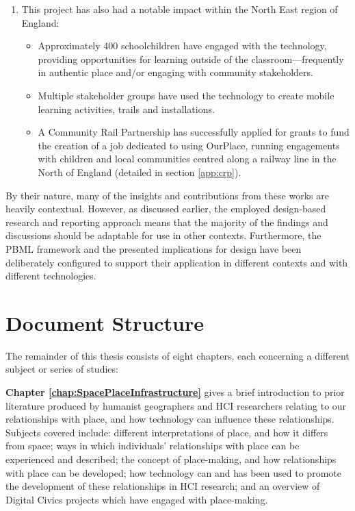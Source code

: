 \begin{enumerate}
    \item This project has also had a notable impact within the North East region of England:
    \begin{itemize}
    \item Approximately 400 schoolchildren have engaged with the technology, providing opportunities for learning outside of the classroom---frequently in authentic place and/or engaging with community stakeholders.
    \item Multiple stakeholder groups have used the technology to create mobile learning activities, trails and installations.
    \item A Community Rail Partnership has successfully applied for grants to fund the creation of a job dedicated to using OurPlace, running engagements with children and local communities centred along a railway line in the North of England (detailed in section \ref{app:crp}).
    \end{itemize}
\end{enumerate}

By their nature, many of the insights and contributions from these works are heavily contextual. However, as discussed earlier, the employed design-based research and reporting approach means that the majority of the findings and discussions should be adaptable for use in other contexts. Furthermore, the PBML framework and the presented implications for design have been deliberately configured to support their application in different contexts and with different technologies.

\section{Document Structure}

The remainder of this thesis consists of eight chapters, each concerning a different subject or series of studies: 

\textbf{Chapter \ref{chap:SpacePlaceInfrastructure}} gives a brief introduction to prior literature produced by humanist geographers and HCI researchers relating to our relationships with place, and how technology can influence these relationships. Subjects covered include: different interpretations of place, and how it differs from space; ways in which individuals' relationships with place can be experienced and described; the concept of place-making, and how relationships with place can be developed; how technology can and has been used to promote the development of these relationships in HCI research; and an overview of Digital Civics projects which have engaged with place-making.

